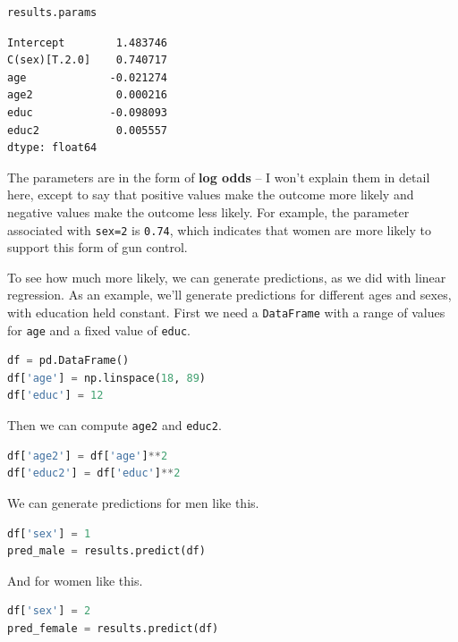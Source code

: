 \begin{lstlisting}[language=Python,style=source]
results.params
\end{lstlisting}

\begin{lstlisting}[style=output]
Intercept        1.483746
C(sex)[T.2.0]    0.740717
age             -0.021274
age2             0.000216
educ            -0.098093
educ2            0.005557
dtype: float64
\end{lstlisting}

The parameters are in the form of \textbf{log odds} -- I won't explain
them in detail here, except to say that positive values make the outcome
more likely and negative values make the outcome less likely. For
example, the parameter associated with \passthrough{\lstinline!sex=2!}
is \passthrough{\lstinline!0.74!}, which indicates that women are more
likely to support this form of gun control.

To see how much more likely, we can generate predictions, as we did with
linear regression. As an example, we'll generate predictions for
different ages and sexes, with education held constant. First we need a
\passthrough{\lstinline!DataFrame!} with a range of values for
\passthrough{\lstinline!age!} and a fixed value of
\passthrough{\lstinline!educ!}.

\begin{lstlisting}[language=Python,style=source]
df = pd.DataFrame()
df['age'] = np.linspace(18, 89)
df['educ'] = 12
\end{lstlisting}

Then we can compute \passthrough{\lstinline!age2!} and
\passthrough{\lstinline!educ2!}.

\begin{lstlisting}[language=Python,style=source]
df['age2'] = df['age']**2
df['educ2'] = df['educ']**2
\end{lstlisting}

We can generate predictions for men like this.

\begin{lstlisting}[language=Python,style=source]
df['sex'] = 1
pred_male = results.predict(df)
\end{lstlisting}

And for women like this.

\begin{lstlisting}[language=Python,style=source]
df['sex'] = 2
pred_female = results.predict(df)
\end{lstlisting}


